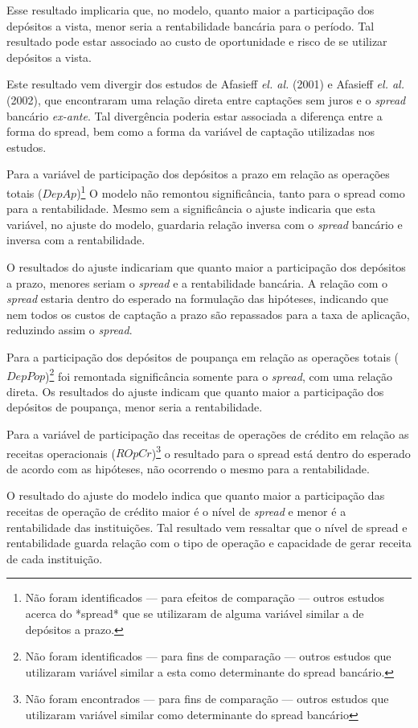 \documentclass[
  12pt,
  12pt,
  openright,
  oneside,
  a4paper,
  chapter=TITLE,
  section=TITLE,
  subsection=TITLE,
  subsubsection=TITLE,
  portugues,
  sumario=tradicional]{abntex2}
\begin{document}
Esse resultado implicaria que, no modelo, quanto maior a participação dos depósitos a vista, menor seria a rentabilidade bancária para o período. Tal resultado pode estar associado ao custo de oportunidade e risco de se utilizar depósitos a vista.

Este resultado vem divergir dos estudos de Afasieff \emph{el. al.} (2001) e Afasieff \emph{el. al.} (2002), que encontraram uma relação direta entre captações sem juros e o \emph{spread} bancário \emph{ex-ante}. Tal divergência poderia estar associada a diferença entre a forma do spread, bem como a forma da variável de captação utilizadas nos estudos.

Para a variável de participação dos depósitos a prazo em relação as operações totais (\(DepAp\))\footnote{Não foram identificados — para efeitos de comparação — outros estudos acerca do *spread* que se utilizaram de alguma variável similar a de depósitos a prazo.} O modelo não remontou significância, tanto para o spread como para a rentabilidade. Mesmo sem a significância o ajuste indicaria que esta variável, no ajuste do modelo, guardaria relação inversa com o \emph{spread} bancário e inversa com a rentabilidade.

O resultados do ajuste indicariam que quanto maior a participação dos depósitos a prazo, menores seriam o \emph{spread} e a rentabilidade bancária. A relação com o \emph{spread} estaria dentro do esperado na formulação das hipóteses, indicando que nem todos os custos de captação a prazo são repassados para a taxa de aplicação, reduzindo assim o \emph{spread}.

Para a participação dos depósitos de poupança em relação as operações totais (\(DepPop\))\footnote{Não foram identificados — para fins de comparação — outros estudos que utilizaram variável similar a esta como determinante do spread bancário.} foi remontada significância somente para o \emph{spread}, com uma relação direta. Os resultados do ajuste indicam que quanto maior a participação dos depósitos de poupança, menor seria a rentabilidade.

Para a variável de participação das receitas de operações de crédito em relação as receitas operacionais (\(ROpCr\))\footnote{Não foram encontrados — para fins de comparação — outros estudos que utilizaram variável similar como determinante do spread bancário} o resultado para o spread está dentro do esperado de acordo com as hipóteses, não ocorrendo o mesmo para a rentabilidade.

O resultado do ajuste do modelo indica que quanto maior a participação das receitas de operação de crédito maior é o nível de \emph{spread} e menor é a rentabilidade das instituições. Tal resultado vem ressaltar que o nível de spread e rentabilidade guarda relação com o tipo de operação e capacidade de gerar receita de cada instituição.
\end{document}
